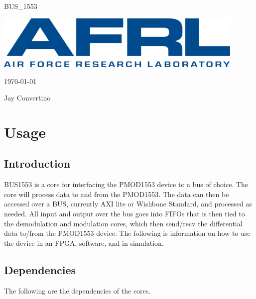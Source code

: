 \begin{titlepage}
  \begin{center}

  {\Huge BUS\_1553}

  \vspace{25mm}

  \includegraphics[width=0.90\textwidth,height=\textheight,keepaspectratio]{img/AFRL.png}

  \vspace{25mm}

  \today

  \vspace{15mm}

  {\Large Jay Convertino}

  \end{center}
\end{titlepage}

\tableofcontents

\newpage

\section{Usage}

\subsection{Introduction}

\par
BUS1553 is a core for interfacing the PMOD1553 device to a bus of choice. The core will process data to and from the PMOD1553.
The data can then be accessed over a BUS, currently AXI lite or Wishbone Standard, and processed as needed. All input and output
over the bus goes into FIFOs that is then tied to the demodulation and modulation cores, which then send/recv the differential data
to/from the PMOD1553 device. The following is information on how to use the device in an FPGA, software, and in simulation.

\subsection{Dependencies}

\par
The following are the dependencies of the cores.

